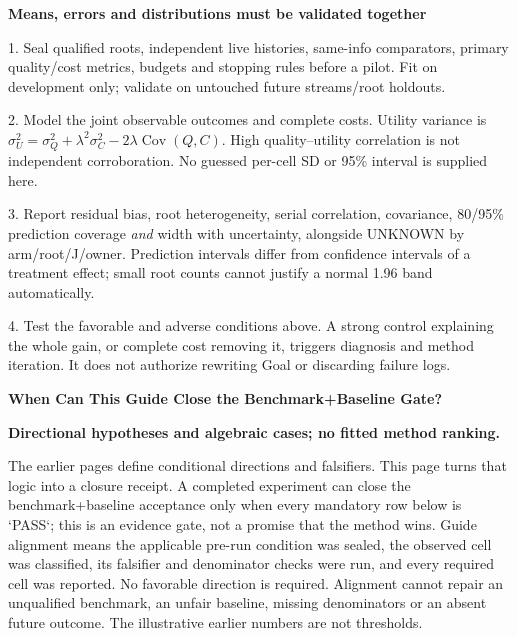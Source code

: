 \documentclass[10pt,a4paper]{article}
\newcommand{\lead}[1]{\vspace{4pt}\textbf{#1}\par}
\newcommand{\caution}{\textcolor{red!70!black}{\textbf{Directional hypotheses and algebraic cases; no fitted method ranking.}}\par}
\begin{document}
\lead{Means, errors and distributions must be validated together}
\small
1. Seal qualified roots, independent live histories, same-info comparators,
primary quality/cost metrics, budgets and stopping rules before a pilot.
Fit on development only; validate on untouched future streams/root holdouts.\par
2. Model the joint observable outcomes and complete costs. Utility variance is
$\sigma_U^2=\sigma_Q^2+\lambda^2\sigma_C^2-2\lambda\operatorname{Cov}(Q,C)$.
High quality--utility correlation is not independent corroboration. No guessed
per-cell SD or 95\% interval is supplied here.\par
3. Report residual bias, root heterogeneity, serial correlation, covariance,
80/95\% prediction coverage \emph{and} width with uncertainty, alongside
UNKNOWN by arm/root/J/owner. Prediction intervals differ from confidence
intervals of a treatment effect; small root counts cannot justify a normal
1.96 band automatically.\par
4. Test the favorable and adverse conditions above. A strong control explaining
the whole gain, or complete cost removing it, triggers diagnosis and method
iteration. It does not authorize rewriting Goal or discarding failure logs.\normalsize

\clearpage
{\large\bfseries When Can This Guide Close the Benchmark+Baseline Gate?}\par\caution
The earlier pages define conditional directions and falsifiers. This page turns
that logic into a closure receipt. A completed experiment can close the
benchmark+baseline acceptance only when every mandatory row below is `PASS`; this is
an evidence gate, not a promise that the method wins.
Guide alignment means the applicable pre-run condition was sealed, the observed
cell was classified, its falsifier and denominator checks were run, and every
required cell was reported. No favorable direction is required. Alignment cannot
repair an unqualified benchmark, an unfair baseline, missing denominators or an
absent future outcome. The illustrative earlier numbers are not thresholds.
\end{document}
